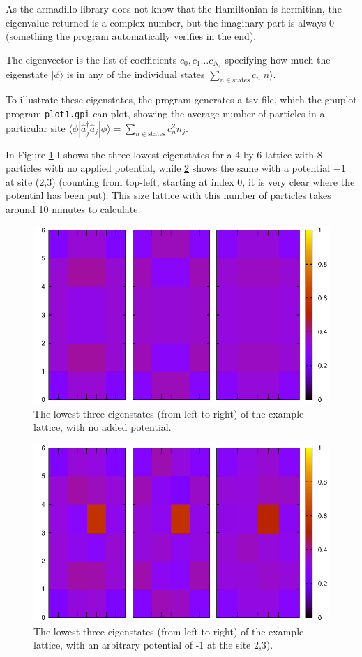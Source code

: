 \documentclass[a4paper,12pt,article]{memoir}
\begin{document}
As the armadillo library does not know that the Hamiltonian is hermitian, the eigenvalue returned is a complex number, but the imaginary part is always 0 (something the program automatically verifies in the end).

The eigenvector is the list of coefficients $c_0,c_1\ldots c_{N_s}$ specifying how much the eigenstate $|\phi\rangle$ is in any of the individual states $\sum_{n\in \mathrm{states}} c_n |n\rangle$.

To illustrate these eigenstates, the program generates a tsv file, which the gnuplot program \lstinline{plot1.gpi} can plot, showing the average number of particles in a particular site $\langle\phi|\hat{a}_j^\dagger \hat{a}_j|\phi \rangle=\sum_{n\in \mathrm{states}} c_n^2 n_j$.

In Figure \ref{fig:A} I shows the three lowest eigenstates for a 4 by 6 lattice with 8 particles with no applied potential, while \ref{fig:B} shows the same with a potential $-1$ at site (2,3) (counting from top-left, starting at index 0, it is very clear where the potential has been put). This size lattice with this number of particles takes around 10 minutes to calculate.

\begin{figure}
\includegraphics[width=\linewidth]{eigenstates.pdf}
\caption{The lowest three eigenstates (from left to right) of the example lattice, with no added potential.}
\label{fig:A}
\end{figure}


\begin{figure}
\includegraphics[width=\linewidth]{eigenstates_potential.pdf}
\caption{The lowest three eigenstates (from left to right) of the example lattice, with an arbitrary potential of -1 at the site 2,3).}
\label{fig:B}
\end{figure}

\printbibliography
\end{document}
